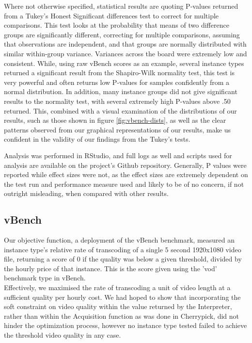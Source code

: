 \documentclass{report}
\begin{document}
Where not otherwise specified, statistical results are quoting P-values returned from a Tukey's Honest Significant differences test to correct for multiple comparisons. This test looks at the probability that means of two difference groups are significantly different, correcting for multiple comparisons, assuming that observations are independent, and that groups are normally distributed with similar within-group variance. Variances across the board were extremely low and consistent. While, using raw vBench scores as an example, several instance types returned a significant result from the Shapiro-Wilk normality test, this test is very powerful and often returns low P-values for samples confidently from a normal distribution. In addition, many  instance groups did not give significant results to the normality test, with several extremely high P-values above .50 returned. This, combined with a visual examination of the distributions of our results, such as those shown in figure \ref{fig:vbench-dists}, as well as the clear patterns observed from our graphical representations of our results, make us confident in the validity of our findings from the Tukey's tests.

Analysis was performed in RStudio\cite{RCoreTeam2018,RStudioTeam2016}, and full logs as well and scripts used for analysis are available on the project's Github repository. Generally, P values were reported while effect sizes were not, as the effect sizes are extremely dependent on the test run and performance measure used and likely to be of no concern, if not outright misleading, when compared with other results.

\subsection{vBench}
Our objective function, a deployment of the vBench benchmark, measured an instance type's relative rate of transcoding of a single 5 second 1920x1080 video file, returning a score of 0 if the quality was below a given threshold, divided by the hourly price of that instance. This is the score given using the 'vod' benchmark type in vBench.\\
Effectively, we maximised the rate of transcoding a unit of video length at a sufficient quality per hourly cost. We had hoped to show that incorporating the soft constraint on video quality within the value returned by the Interpreter, rather than within the Acquisition function as was done in Cherrypick, did not hinder the optimization process, however no instance type tested failed to achieve the threshold video quality in any case.
\end{document}
